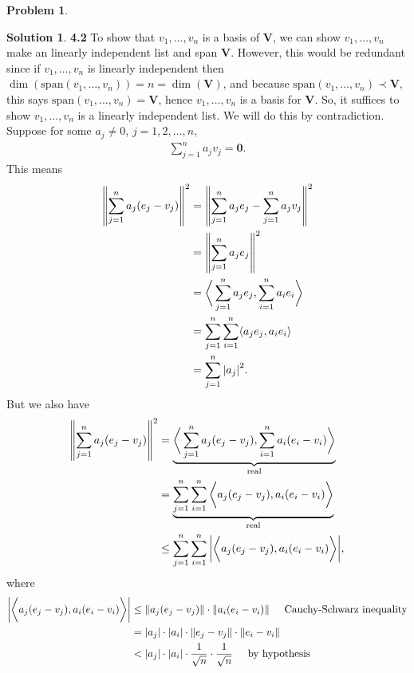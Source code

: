 \documentclass{book}
\theoremstyle{definition}
\newtheorem*{prob*}{Problem}
\newtheorem*{sln*}{Solution}
\newcommand{\V}{\mathbf{V}}
\newcommand{\xpan}{\text{span}}
\newcommand{\la}{\langle}
\newcommand{\ra}{\rangle}
\begin{document}
\begin{prob*}
\begin{enumerate}
		\begin{sln*}\textbf{4.2}
			To show that $v_1,\dots,v_n$ is a basis of $\V$, we can show $v_1,\dots,v_n$ make an linearly independent list and span $\V$. However, this would be redundant since if $v_1,\dots,v_n$ is linearly independent then $\dim(\xpan(v_1,\dots,v_n)) = n = \dim(\V)$, and because $\xpan(v_1,\dots,v_n) \prec \V$, this says $\xpan(v_1,\dots,v_n) = \V$, hence $v_1,\dots,v_n$ is a basis for $\V$. So, it suffices to show $v_1,\dots,v_n$ is a linearly independent list. We will do this by contradiction. \\
			
			Suppose for some $a_j \neq 0$, $j=1,2,\dots,n$,
			\begin{align*}
			\sum^n_{j=1}a_j v_j = \mathbf{0}.
			\end{align*}
			This means
			\begin{align*}
			\norm{\sum^n_{j=1} a_j(e_j - v_j)}^2 
			&= \norm{ \sum^n_{j=1}	a_j e_j - \sum^n_{j=1}a_jv_j }^2 \\
			&= \norm{\sum^n_{j=1}a_je_j}^2 \\
			&= \bigg\la \sum^n_{j=1}a_je_j, \sum^n_{i=1}a_ie_i \bigg\ra  \\
			&= \sum^n_{j=1}\sum^n_{i=1}\la a_j e_j , a_ie_i \ra\\
			&= \sum^n_{j=1}\abs{a_j}^2.
			\end{align*}
			But we also have
			\begin{align*}
			\norm{\sum^n_{j=1} a_j(e_j - v_j)}^2 
			&= \underbrace{\bigg\la    \sum^n_{j=1}a_j(e_j - v_j) , \sum^n_{i=1}a_i(e_i - v_i)\bigg\ra}_{\text{real}}\\
			&= \underbrace{\sum^n_{j=1}\sum^n_{i=1}\bigg\la  a_j(e_j - v_j) , a_i(e_i - v_i)\bigg\ra}_{\text{real}}\\
			&\leq \sum^n_{j=1}\sum^n_{i=1} \bigg\vert \bigg\la a_j(e_j - v_j), a_i(e_i - v_i) \bigg\ra \bigg\vert,
			\end{align*}
			where 
			\begin{align*}
			\bigg\vert \bigg\la a_j(e_j - v_j), a_i(e_i - v_i) \bigg\ra \bigg\vert 
			&\leq \norm{a_j(e_j - v_j)} \cdot \norm{a_i(e_i - v_i)} \hspace{0.5cm} \text{Cauchy-Schwarz inequality} \\
			&= \abs{a_j}\cdot \abs{a_i} \cdot \norm{e_j - v_j}\cdot \norm{e_i - v_i}\\
			&< \abs{a_j}\cdot \abs{a_i}\cdot \frac{1}{\sqrt{n}} \cdot \frac{1}{\sqrt{n}} \hspace{0.5cm}\text{by hypothesis}\\

\end{align*}
\end{sln*}
\end{enumerate}
\end{prob*}
\end{document}
